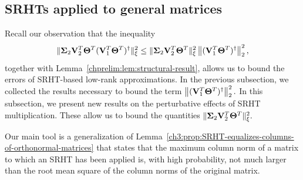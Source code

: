 % 


\subsection{SRHTs applied to general matrices}
\label{ch3:sec:SRHT-orthogonal}

Recall our observation that the inequality
\begin{equation}
 \mbox{}\|\mathbf{\Sigma}_2 \mathbf{V}_2 ^T \mathbf{\Theta}^T 
  ( \mathbf{V}_1 ^T \mathbf{\Theta}^T)^\dagger\|_{\xi}^2 \leq 
 \mbox{}\|\mathbf{\Sigma}_2 \mathbf{V}_2 ^T \mathbf{\Theta}^T\|_{\xi}^2 
 \left\|( \mathbf{V}_1 ^T \mathbf{\Theta}^T)^\dagger\right\|_2^2,
\end{equation}
together with Lemma~\ref{chprelim:lem:structural-result}, allows us to
bound the errors of SRHT-based low-rank approximations. In the previous
subsection, we collected the results necessary to bound the term
$\left\|( \mathbf{V}_1 ^T \mathbf{\Theta}^T)^\dagger\right\|_2^2.$ In this subsection,
we present new results on the perturbative effects of SRHT multiplication. These
allow us to bound the quantities $\mbox{}\|\mathbf{\Sigma}_2 \mathbf{V}_2 ^T \mathbf{\Theta}^T\|_{\xi}^2.$

Our main tool is a generalization of 
Lemma~\ref{ch3:prop:SRHT-equalizes-columns-of-orthonormal-matrices} that 
states that the maximum column norm of a matrix to which an SRHT has been 
applied is, with high probability, not much larger than the root mean square 
of the column norms of the original matrix.

